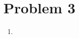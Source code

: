 \documentclass[a4paper]{report}
\begin{document}
\section*{Problem 3}
\begin{enumerate}[label = (\alph*)]

\item 

\end{enumerate}
\end{document}
